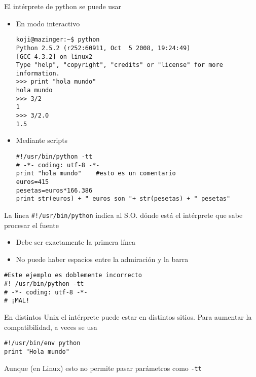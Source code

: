 \documentclass[ucs]{beamer}
\begin{document}
\begin{frame}[fragile]
El intérprete de python se puede usar 
\begin{itemize}
\item 
En modo interactivo
  \begin{scriptsize}
  \begin{verbatim}
koji@mazinger:~$ python
Python 2.5.2 (r252:60911, Oct  5 2008, 19:24:49) 
[GCC 4.3.2] on linux2
Type "help", "copyright", "credits" or "license" for more information.
>>> print "hola mundo"
hola mundo
>>> 3/2
1
>>> 3/2.0
1.5
  \end{verbatim}
  \end{scriptsize}
\item 
Mediante scripts
  \begin{scriptsize}
\begin{verbatim}
#!/usr/bin/python -tt
# -*- coding: utf-8 -*-
print "hola mundo"    #esto es un comentario
euros=415
pesetas=euros*166.386
print str(euros) + " euros son "+ str(pesetas) + " pesetas"
\end{verbatim}
  \end{scriptsize}
\end{itemize}
\end{frame}


\begin{frame}[fragile]
La línea
\verb|#!/usr/bin/python| 
indica al S.O. dónde está el intérprete que sabe procesar el fuente
\begin{itemize}
\item 
Debe ser exactamente la primera línea
\item
No puede haber espacios entre la admiración y la barra
\end{itemize}

  \begin{footnotesize}
  \begin{verbatim}
#Este ejemplo es doblemente incorrecto
#! /usr/bin/python -tt
# -*- coding: utf-8 -*-
# ¡MAL!
  \end{verbatim}
  \end{footnotesize}

En distintos Unix el intérprete puede estar en distintos sitios.
Para aumentar la compatibilidad, a veces
se usa
  \begin{footnotesize}
  \begin{verbatim}
#!/usr/bin/env python
print "Hola mundo"
  \end{verbatim}
  \end{footnotesize}

Aunque (en Linux) esto no permite pasar parámetros como \verb|-tt|

\end{frame}
\end{document}
